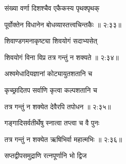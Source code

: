 {\devanagarifont संख्या वर्णा दिशश्चैव एकैकस्य पृथक्पृथक् \thinspace{\dandab} \dontdisplaylinenum }%


{\devanagarifont पूर्वोक्तेन विधानेन बोधव्यास्तत्त्वचिन्तकैः {॥ २:३३॥} \veg\dontdisplaylinenum }%

{\devanagarifont शिवाण्डगमनाकृष्ट्या शिवयोगं सदाभ्यसेत् \thinspace{\dandab} \dontdisplaylinenum }%


{\devanagarifont शिवयोगं विना विप्र तत्र गन्तुं न शक्यते {॥ २:३४॥} \veg\dontdisplaylinenum }%

{\devanagarifont अश्वमेधादियज्ञानां कोट्यायुतशतानि च \thinspace{\dandab} \dontdisplaylinenum }%
 
{\devanagarifont कृच्छ्रादितप सर्वाणि कृत्वा कल्पशतानि च  \danda\dontdisplaylinenum }%


{\devanagarifont तत्र गन्तुं न शक्येत देवैरपि तपोधन {॥ २:३५॥} \veg\dontdisplaylinenum }%

{\devanagarifont गङ्गादिसर्वतीर्थेषु स्नात्वा तप्त्वा च वै पुनः \thinspace{\dandab} \dontdisplaylinenum }%
 

{\devanagarifont तत्र गन्तुं न शक्येत ऋषिभिर्वा महात्मभिः {॥ २:३६॥} \veg\dontdisplaylinenum }%

{\devanagarifont सप्तद्वीपसमुद्राणि रत्नपूर्णानि भो द्विज \thinspace{\dandab} \dontdisplaylinenum }%

